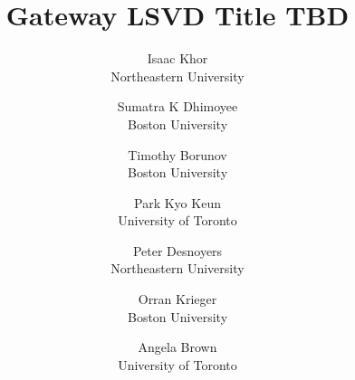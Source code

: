 \documentclass[letterpaper,twocolumn,10pt]{article}
\begin{document}
\date{}

\title{\Large \bf
	Gateway LSVD Title TBD\\}

\author{
	{\rm Isaac Khor}\\
	Northeastern University
	\and
	{\rm Sumatra K Dhimoyee}\\
	Boston University
	\and
	{\rm Timothy Borunov}\\
	Boston University
	\and
	{\rm Park Kyo Keun}\\
	University of Toronto
	\and
	{\rm Peter Desnoyers}\\
	Northeastern University
	\and
	{\rm Orran Krieger}\\
	Boston University
	\and
	{\rm Angela Brown}\\
	University of Toronto
}

\maketitle













\end{document}
